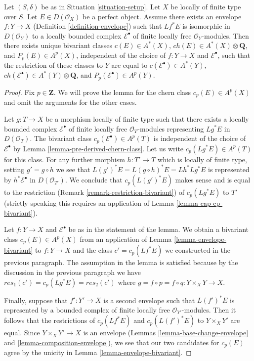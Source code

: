 \begin{lemma}
\label{lemma-defined-by-envelope}
Let $(S, \delta)$ be as in Situation \ref{situation-setup}.
Let $X$ be locally of finite type over $S$. Let $E \in D(\mathcal{O}_X)$
be a perfect object. Assume there exists an envelope
$f : Y \to X$ (Definition \ref{definition-envelope})
such that $Lf^*E$ is isomorphic in $D(\mathcal{O}_Y)$
to a locally bounded complex $\mathcal{E}^\bullet$ of finite locally free
$\mathcal{O}_Y$-modules. Then there exists unique bivariant classes
$c(E) \in A^*(X)$, $ch(E) \in A^*(X) \otimes \mathbf{Q}$, and
$P_p(E) \in A^p(X)$, independent of the choice of $f : Y \to X$
and $\mathcal{E}^\bullet$, such that the restriction of these classes
to $Y$ are equal to $c(\mathcal{E}^\bullet) \in A^*(Y)$,
$ch(\mathcal{E}^\bullet) \in A^*(Y) \otimes \mathbf{Q}$, and
$P_p(\mathcal{E}^\bullet) \in A^p(Y)$.
\end{lemma}

\begin{proof}
Fix $p \in \mathbf{Z}$. We will prove the lemma for the chern
class $c_p(E) \in A^p(X)$ and omit the arguments for the other cases.

\medskip\noindent
Let $g : T \to X$ be a morphism locally of finite type such that
there exists a locally bounded complex $\mathcal{E}^\bullet$ of finite locally
free $\mathcal{O}_T$-modules representing $Lg^*E$ in $D(\mathcal{O}_T)$.
The bivariant class $c_p(\mathcal{E}^\bullet) \in A^p(T)$
is independent of the choice of $\mathcal{E}^\bullet$ by
Lemma \ref{lemma-pre-derived-chern-class}.
Let us write $c_p(Lg^*E) \in A^p(T)$ for this class.
For any further morphism $h : T' \to T$ which is locally
of finite type, setting $g' = g \circ h$ we see that
$L(g')^*E = L(g \circ h)^*E = Lh^*Lg^*E$ is represented by
$h^*\mathcal{E}^\bullet$ in $D(\mathcal{O}_{T'})$.
We conclude that $c_p(L(g')^*E)$ makes sense and is equal to the
restriction (Remark \ref{remark-restriction-bivariant})
of $c_p(Lg^*E)$ to $T'$ (strictly speaking this requires an application of
Lemma \ref{lemma-cap-cp-bivariant}).

\medskip\noindent
Let $f : Y \to X$ and $\mathcal{E}^\bullet$ be as in the statement
of the lemma. We obtain a bivariant class $c_p(E) \in A^p(X)$ from
an application of Lemma \ref{lemma-envelope-bivariant}
to $f : Y \to X$ and the class $c' = c_p(Lf^*E)$ we constructed
in the previous paragraph. The assumption in the lemma is
satisfied because by the discussion in the previous paragraph we have
$res_1(c') = c_p(Lg^*E) = res_2(c')$ where
$g = f \circ p = f \circ q : Y \times_X Y \to X$.

\medskip\noindent
Finally, suppose that $f' : Y' \to X$ is a second envelope
such that $L(f')^*E$ is represented by a bounded complex of
finite locally free $\mathcal{O}_{Y'}$-modules. Then it follows
that the restrictions of $c_p(Lf^*E)$ and $c_p(L(f')^*E)$
to $Y \times_X Y'$ are equal. Since $Y \times_X Y' \to X$
is an envelope (Lemmas \ref{lemma-base-change-envelope} and
\ref{lemma-composition-envelope}), we see that our two candidates for $c_p(E)$
agree by the unicity in Lemma \ref{lemma-envelope-bivariant}.
\end{proof}

